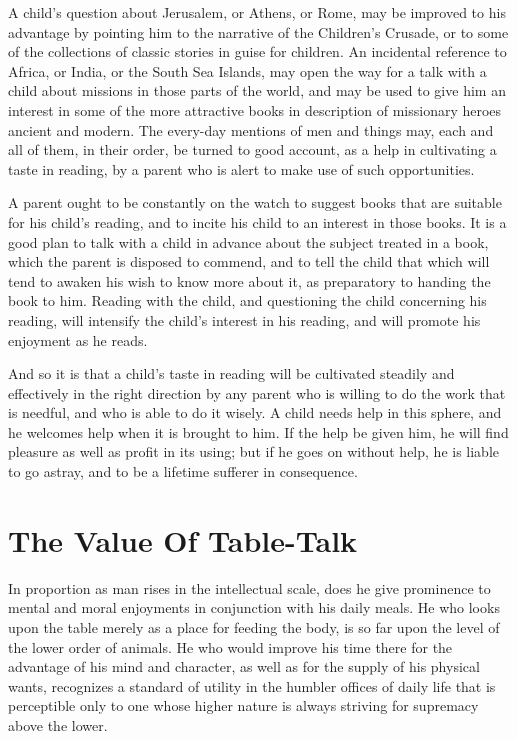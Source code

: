\documentclass[
]{book}
\begin{document}
A child's question about Jerusalem, or Athens, or Rome, may be improved to his advantage by pointing him to the narrative of the Children's Crusade, or to some of the collections of classic stories in guise for children. An incidental reference to Africa, or India, or the South Sea Islands, may open the way for a talk with a child about missions in those parts of the world, and may be used to give him an interest in some of the more attractive books in description of missionary heroes ancient and modern. The every-day mentions of men and things may, each and all of them, in their order, be turned to good account, as a help in cultivating a taste in reading, by a parent who is alert to make use of such opportunities.

A parent ought to be constantly on the watch to suggest books that are suitable for his child's reading, and to incite his child to an interest in those books. It is a good plan to talk with a child in advance about the subject treated in a book, which the parent is disposed to commend, and to tell the child that which will tend to awaken his wish to know more about it, as preparatory to handing the book to him. Reading with the child, and questioning the child concerning his reading, will intensify the child's interest in his reading, and will promote his enjoyment as he reads.

And so it is that a child's taste in reading will be cultivated steadily and effectively in the right direction by any parent who is willing to do the work that is needful, and who is able to do it wisely. A child needs help in this sphere, and he welcomes help when it is brought to him. If the help be given him, he will find pleasure as well as profit in its using; but if he goes on without help, he is liable to go astray, and to be a lifetime sufferer in consequence.

\hypertarget{the-value-of-table-talk}{%
\chapter{The Value Of Table-Talk}\label{the-value-of-table-talk}}

In proportion as man rises in the intellectual scale, does he give prominence to mental and moral enjoyments in conjunction with his daily meals. He who looks upon the table merely as a place for feeding the body, is so far upon the level of the lower order of animals. He who would improve his time there for the advantage of his mind and character, as well as for the supply of his physical wants, recognizes a standard of utility in the humbler offices of daily life that is perceptible only to one whose higher nature is always striving for supremacy above the lower.
\end{document}
